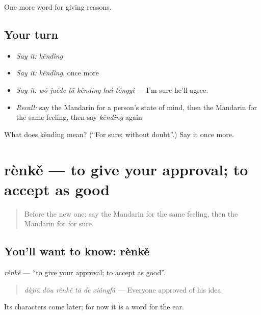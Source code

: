 \begin{grammarlens}[title={What you've built}]
One more word for giving reasons.
\end{grammarlens}

\subsection*{Your turn}
\begin{itemize}
\raggedright
  \item \emph{Say it:} \emph{kěndìng}
  \item \emph{Say it:} \emph{kěndìng}, once more
  \item \emph{Say it:} \emph{wǒ juéde tā kěndìng huì tóngyì} — I'm sure he'll agree.
  \item \emph{Recall:} say the Mandarin for a person's state of mind, then the Mandarin for the same feeling, then say \emph{kěndìng} again
\end{itemize}

\begin{tcolorbox}[breakable,colback=teal!4,colframe=teal!35!black,title={Before you move on}]
What does kěndìng mean? (\textquotedblleft{}For sure; without doubt\textquotedblright{}.) Say it once more.
\end{tcolorbox}
\section[rènkě]{rènkě — to give your approval; to accept as good}

\label{lesson:ZH-C352-renke}



\begin{quote}
Before the new one: say the Mandarin for the same feeling, then the Mandarin for for sure.
\end{quote}

\subsection*{You'll want to know: rènkě}
\emph{rènkě} — \textquotedblleft{}to give your approval; to accept as good\textquotedblright{}.

\begin{quote}
\emph{dàjiā dōu rènkě tā de xiǎngfǎ} — Everyone approved of his idea.
\end{quote}

Its characters come later; for now it is a word for the ear.

